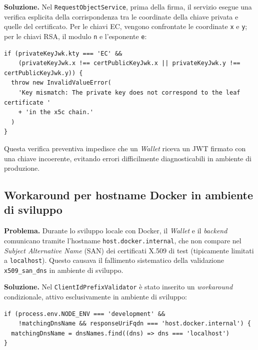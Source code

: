 \textbf{Soluzione.} Nel \texttt{RequestObjectService}, prima della firma, il servizio esegue una verifica esplicita della corrispondenza tra le coordinate della chiave privata e quelle del certificato. Per le chiavi EC, vengono confrontate le coordinate \texttt{x} e \texttt{y}; per le chiavi RSA, il modulo \texttt{n} e l'esponente \texttt{e}:

\begin{listing}[H]
\begin{verbatim}
if (privateKeyJwk.kty === 'EC' &&
    (privateKeyJwk.x !== certPublicKeyJwk.x || privateKeyJwk.y !== certPublicKeyJwk.y)) {
  throw new InvalidValueError(
    'Key mismatch: The private key does not correspond to the leaf certificate ' 
    + 'in the x5c chain.'
  )
}
\end{verbatim}
\caption{Verifica della corrispondenza tra chiave privata e certificato X.509}
\label{listing:key_mismatch}
\end{listing}

Questa verifica preventiva impedisce che un \textit{Wallet} riceva un JWT firmato con una chiave incoerente, evitando errori difficilmente diagnosticabili in ambiente di produzione.

\subsection{Workaround per hostname Docker in ambiente di sviluppo}
\textbf{Problema.} Durante lo sviluppo locale con Docker, il \textit{Wallet} e il \textit{backend} comunicano tramite l'hostname \texttt{host.docker.internal}, che non compare nel \textit{Subject Alternative Name} (SAN) dei certificati X.509 di test (tipicamente limitati a \texttt{localhost}). Questo causava il fallimento sistematico della validazione \texttt{x509\_\allowbreak{}san\_\allowbreak{}dns} in ambiente di sviluppo.

\textbf{Soluzione.} Nel \texttt{ClientIdPrefixValidator} è stato inserito un \textit{workaround} condizionale, attivo esclusivamente in ambiente di sviluppo:

\begin{listing}[H]
\begin{verbatim}
if (process.env.NODE_ENV === 'development' &&
    !matchingDnsName && responseUriFqdn === 'host.docker.internal') {
  matchingDnsName = dnsNames.find((dns) => dns === 'localhost')
}
\end{verbatim}
\caption{Workaround per hostname Docker in ambiente di sviluppo}
\label{listing:workaround_docker}
\end{listing}

